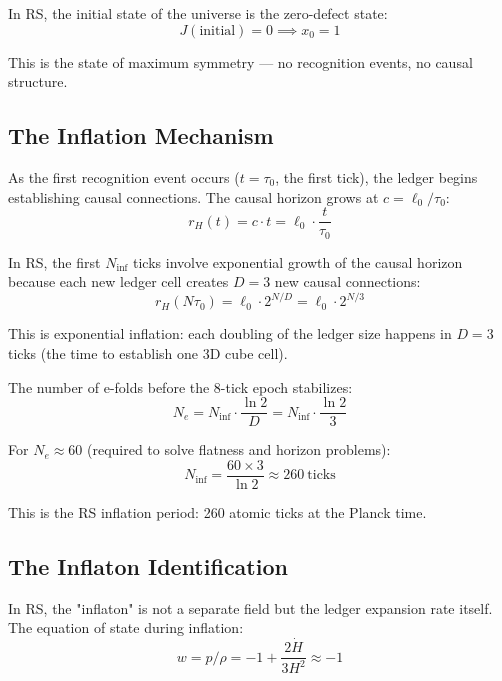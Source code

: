 \documentclass[12pt,a4paper]{article}
\theoremstyle{definition}
\theoremstyle{remark}
\begin{document}
In RS, the initial state of the universe is the zero-defect state:
\begin{equation}
J(\text{initial}) = 0 \implies x_0 = 1
\end{equation}

This is the state of maximum symmetry — no recognition events, no causal structure.

\subsection{The Inflation Mechanism}

As the first recognition event occurs ($t = \tau_0$, the first tick), the ledger 
begins establishing causal connections. The causal horizon grows at $c = \ell_0/\tau_0$:
\begin{equation}
r_H(t) = c \cdot t = \ell_0 \cdot \frac{t}{\tau_0}
\end{equation}

In RS, the first $N_\mathrm{inf}$ ticks involve exponential growth of the causal 
horizon because each new ledger cell creates $D = 3$ new causal connections:
\begin{equation}
r_H(N\tau_0) = \ell_0 \cdot 2^{N/D} = \ell_0 \cdot 2^{N/3}
\end{equation}

This is exponential inflation: each doubling of the ledger size happens in $D = 3$ 
ticks (the time to establish one 3D cube cell).

The number of e-folds before the 8-tick epoch stabilizes:
\begin{equation}
N_e = N_\mathrm{inf} \cdot \frac{\ln 2}{D} = N_\mathrm{inf} \cdot \frac{\ln 2}{3}
\end{equation}

For $N_e \approx 60$ (required to solve flatness and horizon problems):
\begin{equation}
N_\mathrm{inf} = \frac{60 \times 3}{\ln 2} \approx 260~\text{ticks}
\end{equation}

This is the RS inflation period: 260 atomic ticks at the Planck time.

\subsection{The Inflaton Identification}

In RS, the "inflaton" is not a separate field but the ledger expansion rate itself.
The equation of state during inflation:
\begin{equation}
w = p/\rho = -1 + \frac{2\dot{H}}{3H^2} \approx -1
\end{equation}
\end{document}
